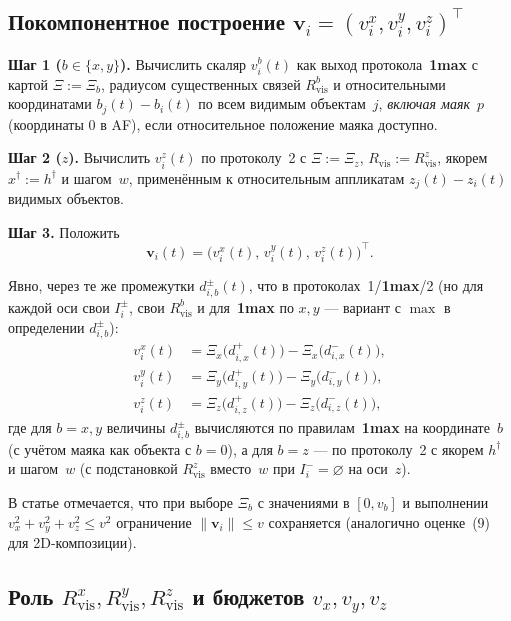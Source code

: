 \documentclass[12pt,a4paper]{article}
\begin{document}
\subsection{Покомпонентное построение $\mathbf{v}_i=(v_i^x,v_i^y,v_i^z)^\top$}

\textbf{Шаг 1 ($b\in\{x,y\}$).} Вычислить скаляр $v_i^b(t)$ как выход протокола~\textbf{1max} с картой $\Xi:=\Xi_b$, радиусом существенных связей $R_{\mathrm{vis}}^b$ и относительными координатами $b_j(t)-b_i(t)$ по всем видимым объектам~$j$, \emph{включая маяк}~$p$ (координаты $0$ в AF), если относительное положение маяка доступно.

\textbf{Шаг 2 ($z$).} Вычислить $v_i^z(t)$ по протоколу~2 с $\Xi:=\Xi_z$, $R_{\mathrm{vis}}:=R_{\mathrm{vis}}^z$, якорем $x^\dagger:=h^\dagger$ и шагом~$w$, применённым к относительным аппликатам $z_j(t)-z_i(t)$ видимых объектов.

\textbf{Шаг 3.} Положить
\begin{equation}
  \mathbf{v}_i(t)=\bigl(v_i^x(t),\,v_i^y(t),\,v_i^z(t)\bigr)^\top.
\end{equation}

Явно, через те же промежутки $d_{i,b}^{\pm}(t)$, что в протоколах~1/\textbf{1max}/2 (но для каждой оси свои $I_i^{\pm}$, свои $R_{\mathrm{vis}}^b$ и для~\textbf{1max} по $x,y$ --- вариант с $\max$ в определении $d_{i,b}^{\pm}$):
\begin{align}
  v_i^x(t) &= \Xi_x\!\bigl(d_{i,x}^{+}(t)\bigr)-\Xi_x\!\bigl(d_{i,x}^{-}(t)\bigr),\\
  v_i^y(t) &= \Xi_y\!\bigl(d_{i,y}^{+}(t)\bigr)-\Xi_y\!\bigl(d_{i,y}^{-}(t)\bigr),\\
  v_i^z(t) &= \Xi_z\!\bigl(d_{i,z}^{+}(t)\bigr)-\Xi_z\!\bigl(d_{i,z}^{-}(t)\bigr),
\end{align}
где для $b=x,y$ величины $d_{i,b}^{\pm}$ вычисляются по правилам~\textbf{1max} на координате~$b$ (с учётом маяка как объекта с $b=0$), а для $b=z$ --- по протоколу~2 с якорем $h^\dagger$ и шагом~$w$ (с подстановкой $R_{\mathrm{vis}}^z$ вместо~$w$ при $I_i^{-}=\varnothing$ на оси~$z$).

В статье отмечается, что при выборе $\Xi_b$ с значениями в $[0,v_b]$ и выполнении $v_x^2+v_y^2+v_z^2\le v^2$ ограничение $\|\mathbf{v}_i\|\le v$ сохраняется (аналогично оценке~(9) для 2D-композиции).

\subsection{Роль $R_{\mathrm{vis}}^x,R_{\mathrm{vis}}^y,R_{\mathrm{vis}}^z$ и бюджетов $v_x,v_y,v_z$}
\end{document}

